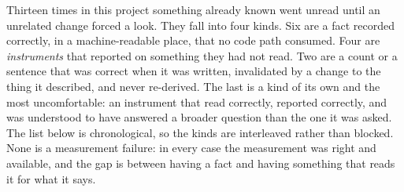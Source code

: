 Thirteen times in this project something already known went unread until an
unrelated change forced a look. They fall into four kinds. Six are a fact
recorded correctly, in a machine-readable place, that no code path consumed.
Four are \emph{instruments} that reported on something they had not read. Two
are a count or a sentence that was correct when it was written, invalidated by a
change to the thing it described, and never re-derived. The last is a kind of its
own and the most uncomfortable: an instrument that read correctly, reported
correctly, and was understood to have answered a broader question than the one
it was asked. The list below is chronological, so the kinds are interleaved
rather than blocked. None is a measurement failure: in every case the
measurement was right and available, and the gap is between having a fact and
having something that reads it for what it says.

